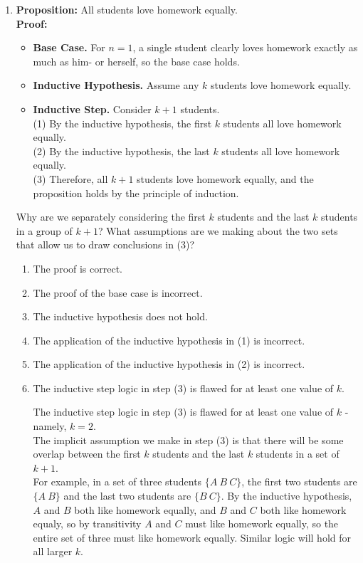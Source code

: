 \documentclass[11pt, preview]{standalone} %
\begin{document}
\begin{enumerate}
\item 
{\bf Proposition:} All students love homework equally.
\\
{\bf Proof:}
\begin{itemize}
\item {\bf Base Case.} For $n = 1$, a single student clearly loves homework exactly as much as him- or herself, so the base case holds.
\item {\bf Inductive Hypothesis.} Assume any $k$ students love homework equally. 
\item {\bf Inductive Step.} 
Consider $k+1$ students. \\
(1) By the inductive hypothesis, the first $k$ students all love homework equally. \\
(2) By the inductive hypothesis, the last $k$ students all love homework equally. \\
(3) Therefore, all $k+1$ students love homework equally, and the proposition holds by the principle of induction.
\end{itemize}
\begin{Choices}
\Hint Why are we separately considering the first $k$ students and the last $k$ students in a group of $k + 1$? What assumptions are we making about the two sets that allow us to draw conclusions in (3)?
\begin{enumerate}
\FalseChoice\item The proof is correct.
\FalseChoice\item The proof of the base case is incorrect. 
\FalseChoice\item The inductive hypothesis does not hold.
\FalseChoice\item The application of the inductive hypothesis in (1) is incorrect.
\FalseChoice\item The application of the inductive hypothesis in (2) is incorrect.
\TrueChoice\item The inductive step logic in step (3) is flawed for at least one value of $k$.

\Solution The inductive step logic in step (3) is flawed for at least one value of $k$ - namely, $k = 2$.\\

The implicit assumption we make in step (3) is that there will be some overlap between the first $k$ students and the last $k$ students in a set of $k + 1$.\\ 

For example, in a set of three students $\{A\ B\ C\}$, the first two students are $\{A\ B\}$ and the last two students are $\{B\ C\}$. By the inductive hypothesis, $A$ and $B$ both like homework equally, and $B$ and $C$ both like homework equaly, so by transitivity $A$ and $C$ must like homework equally, so the entire set of three must like homework equally. Similar logic will hold for all larger $k$.\\


\end{enumerate}
\end{Choices}
\end{enumerate}
\end{document}
